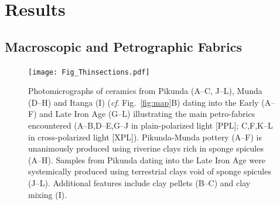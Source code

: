 \documentclass[smallextended,natbib]{svjour3}       %
\begin{document}
\section{Results}

\subsection{Macroscopic and Petrographic Fabrics}

\begin{figure}[!tb]
	\texttt{[image: Fig\_Thinsections.pdf]}
	\caption{Photomicrographs of ceramics from Pikunda (A--C, J--L), Munda (D--H) and Itanga (I) (\textit{cf}. Fig.~\ref{fig:map}B) dating into the Early (A--F) and Late Iron Age (G--L) illustrating the main petro-fabrics encountered (A--B,D--E,G--J in plain-polarized light [PPL]; C,F,K--L in cross-polarized light [XPL]). Pikunda-Munda pottery (A--F) is unanimously produced using riverine clays rich in sponge spicules (A--H). Samples from Pikunda dating into the Late Iron Age were systemically produced using terrestrial clays void of sponge spicules (J--L). Additional features include clay pellets (B--C) and clay mixing (I).}
	\label{fig:thinsections}
\end{figure}
\end{document}
